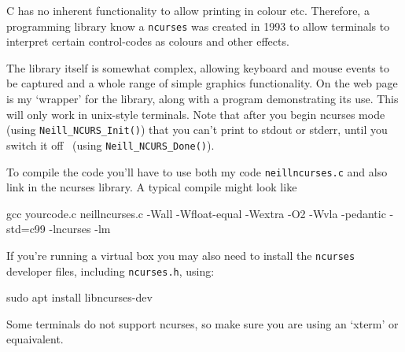 C has no inherent functionality to allow printing in colour etc.
Therefore, a programming library know a \verb^ncurses^ was created in 1993
to allow terminals to interpret certain control-codes as colours and other effects. 

The library itself is somewhat complex, allowing keyboard and mouse events to
be captured and a whole range of simple graphics functionality.
On the web page is my `wrapper' for the library, along with a program demonstrating its use.
This will only work in unix-style terminals. 
Note that after you begin ncurses mode (using \verb^Neill_NCURS_Init()^) that
you can't print to stdout or stderr, until you switch it off ~(using \verb^Neill_NCURS_Done()^).

To compile the code you'll have to use both my code \verb^neillncurses.c^
and also link in the ncurses library. A typical compile might look like
\begin{terminaloutput}
gcc yourcode.c neillncurses.c -Wall -Wfloat-equal -Wextra -O2
    -Wvla -pedantic -std=c99 -lncurses -lm
\end{terminaloutput}

If you're running a virtual box you may also need to install the \verb^ncurses^ developer
files, including \verb^ncurses.h^, using:
\begin{terminaloutput}
sudo apt install libncurses-dev
\end{terminaloutput}

Some terminals do not support ncurses, so make sure you are using an `xterm' or equaivalent.
